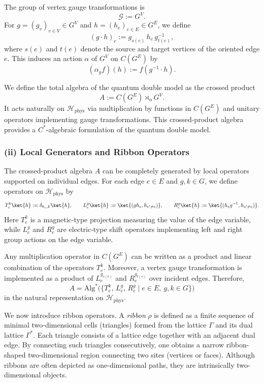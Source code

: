 \documentclass[12pt]{article}
\theoremstyle{definition} %
\theoremstyle{plain} %
\theoremstyle{remark} %
\theoremstyle{underline}
\begin{document}
The group of vertex gauge transformations is
\[
    \mathcal G := G^{V}.
\]
For $g=(g_v)_{v\in V}\in G^{V}$ and $h=(h_e)_{e\in E}\in G^{E}$, we define
\[
    (g\cdot h)_e := g_{s(e)}\,h_e\,g_{t(e)}^{-1},
\]
where $s(e)$ and $t(e)$ denote the source and target vertices of the oriented edge $e$.
This induces an action $\alpha$ of $G^{V}$ on $C(G^{E})$ by
\[
    (\alpha_g f)(h) := f(g^{-1}\cdot h).
\]

We define the total algebra of the quantum double model as the crossed product
\[
    A := C(G^{E}) \rtimes_{\alpha} G^{V}.
\]
It acts naturally on $\mathcal H_{\mathrm{phys}}$ via multiplication by functions in $C(G^{E})$ and unitary operators implementing gauge transformations.
This crossed-product algebra provides a $C^*$-algebraic formulation of the quantum double model.

\subsubsection*{(ii) Local Generators and Ribbon Operators}

The crossed-product algebra $A$ can be completely generated by local operators supported on individual edges.
For each edge $e\in E$ and $g,k\in G$, we define operators on
$\mathcal H_{\mathrm{phys}}$ by
\[
    T_e^k \ket{h} := \delta_{h_e,k}\ket{h}, \qquad
    L_e^g \ket{h} := \ket{(g h_e, h_{e'\neq e})}, \qquad
    R_e^g \ket{h} := \ket{(h_e g^{-1}, h_{e'\neq e})}.
\]
Here $T_e^k$ is a magnetic-type projection measuring the value of the edge variable, while $L_e^g$ and $R_e^g$ are electric-type shift operators implementing left and right group actions on the edge variable.

Any multiplication operator in $C(G^{E})$ can be written as a product and linear combination of the operators $T_e^k$.
Moreover, a vertex gauge transformation is implemented as a product of $L_e^{g_{s(e)}}$ and $R_e^{g_{t(e)}}$ over incident edges.
Therefore,
\[
    A = \mathrm{Alg}^\ast\bigl(\{T_e^k,\,L_e^g,\,R_e^g \mid e\in E,\ g,k\in G\}\bigr)
\]
in the natural representation on $\mathcal H_{\mathrm{phys}}$.

We now introduce ribbon operators.
A \emph{ribbon} $\rho$ is defined as a finite sequence of minimal two-dimensional cells (triangles) formed from the lattice $\Gamma$ and its dual lattice $\Gamma^\ast$.
Each triangle consists of a lattice edge together with an adjacent dual edge.
By connecting such triangles consecutively, one obtains a narrow ribbon-shaped two-dimensional region connecting two sites (vertices or faces).
Although ribbons are often depicted as one-dimensional paths, they are intrinsically two-dimensional objects.
\end{document}
